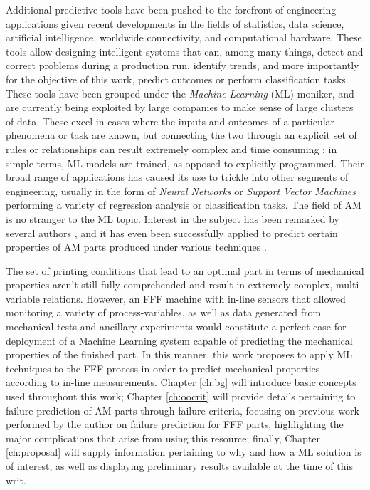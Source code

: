 \documentclass[main.tex]{subfiles}
\begin{document}
Additional predictive tools have been pushed to the forefront of engineering applications given recent developments in the fields of statistics, data science, artificial intelligence, worldwide connectivity, and computational hardware. These tools allow designing intelligent systems that can, among many things, detect and correct problems during a production run, identify trends, and more importantly for the objective of this work, predict outcomes or perform classification tasks. These tools have been grouped under the \emph{Machine Learning} (ML) moniker, and are currently being exploited by large companies to make sense of large clusters of data. These excel in cases where the inputs and outcomes of a particular phenomena or task are known, but connecting the two through an explicit set of rules or relationships can result extremely complex and time consuming \cite{Chollet2018}: in simple terms, ML models are trained, as opposed to explicitly programmed. Their broad range of applications has caused its use to trickle into other segments of engineering, usually in the form of \emph{Neural Networks} or \emph{Support Vector Machines} performing a variety of regression analysis or classification tasks. The field of AM is no stranger to the ML topic. Interest in the subject has been remarked by several authors \cite{Qi2019, Razvi2019, Meng2020}, and it has even been successfully applied to predict certain properties of AM parts produced under various techniques \cite{Qi2019, Razvi2019, Meng2020, Sood2012}. 

The set of printing conditions that lead to an optimal part in terms of mechanical properties aren't still fully comprehended and result in extremely complex, multi-variable relations. However, an FFF machine with in-line sensors that allowed monitoring a variety of process-variables, as well as data generated from mechanical tests and ancillary experiments would constitute a perfect case for deployment of a Machine Learning system capable of predicting the mechanical properties of the finished part. In this manner, this work proposes to apply ML techniques to the FFF process in order to predict mechanical properties according to in-line measurements. Chapter \ref{ch:bg} will introduce basic concepts used throughout this work; Chapter \ref{ch:oocrit} will provide details pertaining to failure prediction of AM parts through failure criteria, focusing on previous work performed by the author on failure prediction for FFF parts, highlighting the major complications that arise from using this resource; finally, Chapter \ref{ch:proposal} will supply information pertaining to why and how a ML solution is of interest, as well as displaying preliminary results available at the time of this writ.

% 
%
%
%
%
%
%
%
\end{document}
